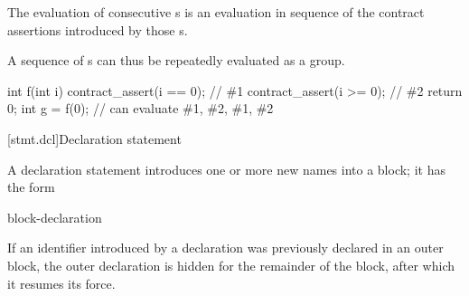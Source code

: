 \pnum
The evaluation of consecutive s
is an evaluation in sequence of
the contract assertions introduced
by those s.
\begin{note}
A sequence of s
can thus be repeatedly evaluated as a group.
\begin{example}
\begin{codeblock}
int f(int i)
{
  contract_assert(i == 0);  // \#1
  contract_assert(i >= 0);  // \#2
  return 0;
}
int g = f(0);   // can evaluate \#1, \#2, \#1, \#2
\end{codeblock}
\end{example}
\end{note}

[stmt.dcl]{Declaration statement}%

\pnum
A declaration statement introduces one or more new names into a
block; it has the form
\begin{bnf}
\br
    block-declaration
\end{bnf}
\begin{note}
If an identifier introduced by a declaration was previously declared in
an outer block,
%
%
%
the outer declaration is hidden
for the remainder of the block,
after which it resumes its force.
\end{note}

